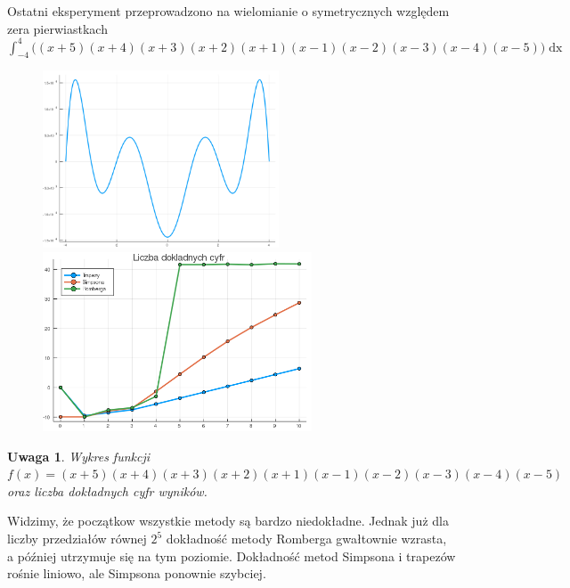 \documentclass[11pt,wide]{article}
\newtheorem{remark}{Uwaga}
\begin{document}
Ostatni eksperyment przeprowadzono na wielomianie o symetrycznych względem zera pierwiastkach \(\displaystyle \int_{-4}^{4} \Big((x+5)(x+4)(x+3)(x+2)(x+1)(x-1)(x-2)(x-3)(x-4)(x-5)\Big)\mathop{dx} \)
\begin{figure}[h!]
	\includegraphics[width=70mm,scale=0.5]{wiel6}
	\includegraphics[width=80mm,scale=0.5]{wiel_blad6}
\end{figure}
\begin{remark}
\centering
Wykres funkcji \(f(x) = (x+5)(x+4)(x+3)(x+2)(x+1)(x-1)(x-2)(x-3)(x-4)(x-5) \) \\ oraz liczba dokładnych cyfr wyników.
\end{remark}
Widzimy, że początkow wszystkie metody są bardzo niedokładne. Jednak już dla liczby przedziałów równej \(2^5\) dokładność metody Romberga gwałtownie wzrasta, a później utrzymuje się na tym poziomie. Dokładność metod Simpsona i trapezów rośnie liniowo, ale Simpsona ponownie szybciej.
\end{document}
